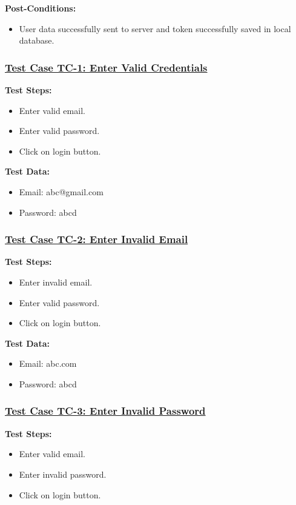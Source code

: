 \textbf{Post-Conditions: }
\begin{itemize}
\item User data successfully sent to server and token successfully saved in local database.
\end{itemize}
\subsubsection{\underline{Test Case TC-1: Enter Valid Credentials}}
\textbf{Test Steps:}
\begin{itemize}

\item Enter valid email.
\item Enter valid password.
\item Click on login button.

\end{itemize}

\textbf{Test Data:}
\begin{itemize}

\item Email: abc@gmail.com
\item Password: abcd

\end{itemize}

\subsubsection{\underline{Test Case TC-2: Enter Invalid Email}}
\textbf{Test Steps:}
\begin{itemize}

\item Enter invalid email.
\item Enter valid password.
\item Click on login button.

\end{itemize}

\textbf{Test Data:}
\begin{itemize}

\item Email: abc.com
\item Password: abcd

\end{itemize}

\subsubsection{\underline{Test Case TC-3: Enter Invalid Password}}
\textbf{Test Steps:}
\begin{itemize}

\item Enter valid email.
\item Enter invalid password.
\item Click on login button.

\end{itemize}

